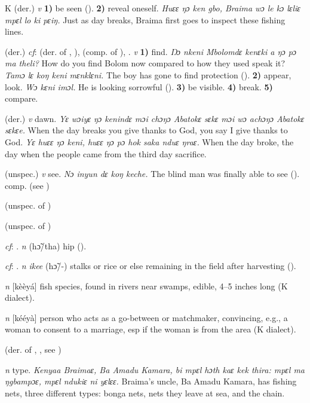 \begin{letter}{K}
 (der.) \textit{v} \textbf{1)} be seen (\citealt{Sumner1921}). \textbf{2)} reveal oneself. \textit{Huɛɛ ŋɔ ken gbo, Braima wɔ le kɔ lɛliɛ mpɛl lo ki pɛiŋ.} Just as day breaks, Braima first goes to inspect these fishing lines.

 (der.) \textit{cf}:  (der. of , ),  (comp. of ), . \textit{v} \textbf{1)} find. \textit{Ŋɔ nkeni Mbolomdɛ kenɛki a ŋɔ pɔ ma theli?} How do you find Bolom now compared to how they used speak it? \textit{Tamɔ lɛ koŋ keni mɛnklɛni.} The boy has gone to find protection (\citealt{Pichl1967}). \textbf{2)} appear, look. \textit{Wɔ kɛni imɔl.} He is looking sorrowful (\citealt{Pichl1967}). \textbf{3)} be visible. \textbf{4)} break. \textbf{5)} compare.

 (der.) \textit{v} dawn. \textit{Yɛ wɔiyɛ ŋɔ kenindɛ mɔi chɔŋɔ Abatokɛ sɛkɛ mɔi wɔ achɔŋɔ Abatokɛ sɛkɛe.} When the day breaks you give thanks to God, you say I give thanks to God. \textit{Yɛ huɛɛ ŋɔ keni, huɛɛ ŋɔ pɔ hok saka nduɛ ŋraɛ.} When the day broke, the day when the people came from the third day sacrifice.

 (unspec.) \textit{v} see. \textit{Nɔ inyun dɛ koŋ keche.} The blind man was finally able to see (\citealt{Pichl1967}). comp.  (see )

 (unspec. of ) 

 (unspec. of ) 

 \textit{cf}: . \textit{n} (hɔ̃/tha) hip (\citealt{Pichl1967}). 

 \textit{cf}: . \textit{n} \textit{ikee} (hɔ̃/-) stalks or rice or else remaining in the field after harvesting (\citealt{Pichl1967}). 

 \textit{n} [kèèyá] fish species, found in rivers near swamps, edible, 4–5 inches long (K dialect).

 \textit{n} [kééyà] person who acts as a go-between or matchmaker, convincing, e.g., a woman to consent to a marriage, esp if the woman is from the area (K dialect). 

 (der. of , , see )

 \textit{n} type. \textit{Kenyaa Braimaɛ, Ba Amadu Kamara, bi mpɛl hɔth kaɛ kek thira: mpɛl ma ŋgbampɔɛ, mpɛl ndukiɛ ni yɛlɛɛ.} Braima's uncle, Ba Amadu Kamara, has fishing nets, three different types: bonga nets, nets they leave at sea, and the chain.


\end{letter}
